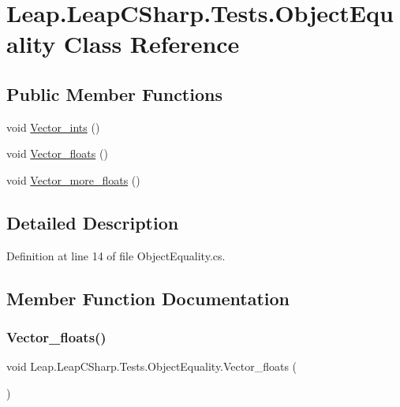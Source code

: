 \hypertarget{class_leap_1_1_leap_c_sharp_1_1_tests_1_1_object_equality}{}\section{Leap.\+Leap\+C\+Sharp.\+Tests.\+Object\+Equality Class Reference}
\label{class_leap_1_1_leap_c_sharp_1_1_tests_1_1_object_equality}
\subsection*{Public Member Functions}
\begin{DoxyCompactItemize}
\item 
void \mbox{\hyperlink{class_leap_1_1_leap_c_sharp_1_1_tests_1_1_object_equality_a08e1f1866ddcb0ce5fea14cbc17a43d0}{Vector\+\_\+ints}} ()
\item 
void \mbox{\hyperlink{class_leap_1_1_leap_c_sharp_1_1_tests_1_1_object_equality_afbc37ef469be74e009c9d841453c7418}{Vector\+\_\+floats}} ()
\item 
void \mbox{\hyperlink{class_leap_1_1_leap_c_sharp_1_1_tests_1_1_object_equality_a171da70f23f5ceb3a8ec713bf161998d}{Vector\+\_\+more\+\_\+floats}} ()
\end{DoxyCompactItemize}


\subsection{Detailed Description}


Definition at line 14 of file Object\+Equality.\+cs.



\subsection{Member Function Documentation}
\mbox{\label{class_leap_1_1_leap_c_sharp_1_1_tests_1_1_object_equality_afbc37ef469be74e009c9d841453c7418}} 
\subsubsection{\texorpdfstring{Vector\_floats()}{Vector\_floats()}}
{\footnotesize\ttfamily void Leap.\+Leap\+C\+Sharp.\+Tests.\+Object\+Equality.\+Vector\+\_\+floats (\begin{DoxyParamCaption}{ }\end{DoxyParamCaption})}



